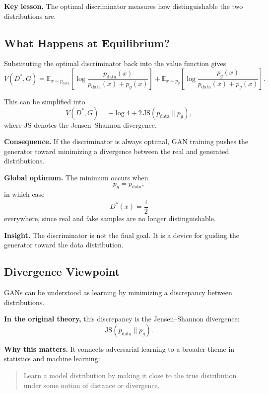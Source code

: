 \medskip

\noindent
\textbf{Key lesson.}
The optimal discriminator measures how distinguishable the two distributions are.

\subsection{What Happens at Equilibrium?}

Substituting the optimal discriminator back into the value function gives
\[
V(D^*,G)
=
\mathbb{E}_{x\sim p_{\text{data}}}
\left[
\log \frac{p_{\text{data}}(x)}{p_{\text{data}}(x)+p_g(x)}
\right]
+
\mathbb{E}_{x\sim p_g}
\left[
\log \frac{p_g(x)}{p_{\text{data}}(x)+p_g(x)}
\right].
\]

This can be simplified into
\[
V(D^*,G)
=
- \log 4 + 2\,\mathrm{JS}(p_{\text{data}}\|p_g),
\]
where $\mathrm{JS}$ denotes the Jensen--Shannon divergence.

\medskip

\noindent
\textbf{Consequence.}
If the discriminator is always optimal, GAN training pushes the generator toward minimizing a divergence between the real and generated distributions.

\medskip

\noindent
\textbf{Global optimum.}
The minimum occurs when
\[
p_g = p_{\text{data}},
\]
in which case
\[
D^*(x)=\frac12
\]
everywhere, since real and fake samples are no longer distinguishable.

\medskip

\noindent
\textbf{Insight.}
The discriminator is not the final goal. It is a device for guiding the generator toward the data distribution.

\subsection{Divergence Viewpoint}

GANs can be understood as learning by minimizing a discrepancy between distributions.

\medskip

\noindent
\textbf{In the original theory,} this discrepancy is the Jensen--Shannon divergence:
\[
\mathrm{JS}(p_{\text{data}}\|p_g).
\]

\medskip

\noindent
\textbf{Why this matters.}
It connects adversarial learning to a broader theme in statistics and machine learning:
\begin{quote}
Learn a model distribution by making it close to the true distribution under some notion of distance or divergence.
\end{quote}

